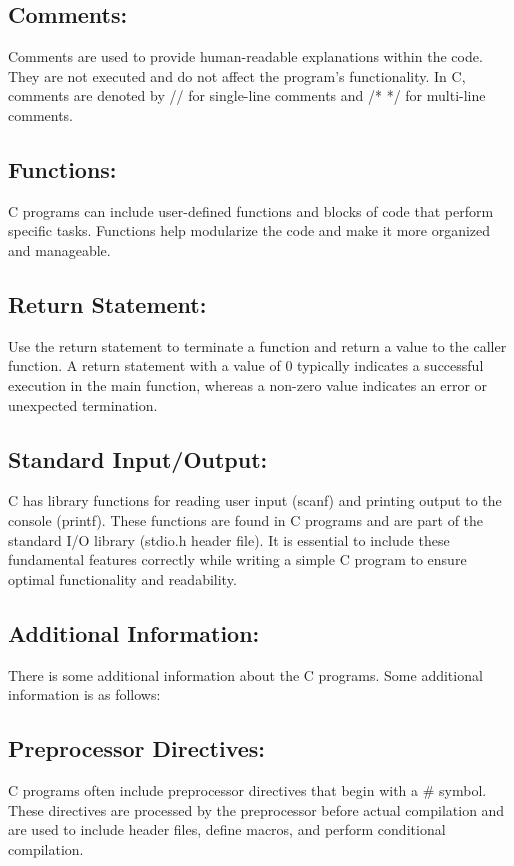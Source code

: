 \subsection{Comments:}
Comments are used to provide human-readable explanations within the code. They are not executed and do not affect the program's functionality. In C, comments are denoted by // for single-line comments and /* */ for multi-line comments.

\subsection{Functions:}
C programs can include user-defined functions and blocks of code that perform specific tasks. Functions help modularize the code and make it more organized and manageable.

\subsection{Return Statement:}
Use the return statement to terminate a function and return a value to the caller function. A return statement with a value of 0 typically indicates a successful execution in the main function, whereas a non-zero value indicates an error or unexpected termination.

\subsection{Standard Input/Output:}
C has library functions for reading user input (scanf) and printing output to the console (printf). These functions are found in C programs and are part of the standard I/O library (stdio.h header file). It is essential to include these fundamental features correctly while writing a simple C program to ensure optimal functionality and readability.

\subsection{Additional Information:}
There is some additional information about the C programs. Some additional information is as follows:

\subsection{Preprocessor Directives:}
C programs often include preprocessor directives that begin with a \# symbol. These directives are processed by the preprocessor before actual compilation and are used to include header files, define macros, and perform conditional compilation.

